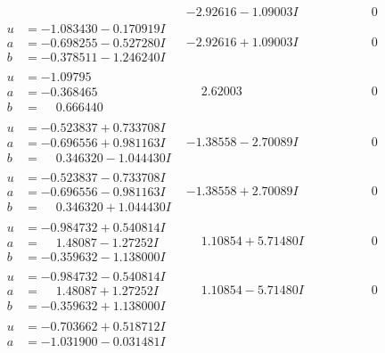 \documentclass[1p]{elsarticle_modified}
\theoremstyle{definition}
\begin{document}
$$\begin{array}{c|c|c}
 & -2.92616 - 1.09003 I & \phantom{-0.000000 } 0 \\ \hline\begin{aligned}
u &= -1.083430 - 0.170919 I \\
a &= -0.698255 - 0.527280 I \\
b &= -0.378511 - 1.246240 I\end{aligned}
 & -2.92616 + 1.09003 I & \phantom{-0.000000 } 0 \\ \hline\begin{aligned}
u &= -1.09795\phantom{ +0.000000I} \\
a &= -0.368465\phantom{ +0.000000I} \\
b &= \phantom{-}0.666440\phantom{ +0.000000I}\end{aligned}
 & \phantom{-}2.62003\phantom{ +0.000000I} & \phantom{-0.000000 } 0 \\ \hline\begin{aligned}
u &= -0.523837 + 0.733708 I \\
a &= -0.696556 + 0.981163 I \\
b &= \phantom{-}0.346320 - 1.044430 I\end{aligned}
 & -1.38558 - 2.70089 I & \phantom{-0.000000 } 0 \\ \hline\begin{aligned}
u &= -0.523837 - 0.733708 I \\
a &= -0.696556 - 0.981163 I \\
b &= \phantom{-}0.346320 + 1.044430 I\end{aligned}
 & -1.38558 + 2.70089 I & \phantom{-0.000000 } 0 \\ \hline\begin{aligned}
u &= -0.984732 + 0.540814 I \\
a &= \phantom{-}1.48087 - 1.27252 I \\
b &= -0.359632 - 1.138000 I\end{aligned}
 & \phantom{-}1.10854 + 5.71480 I & \phantom{-0.000000 } 0 \\ \hline\begin{aligned}
u &= -0.984732 - 0.540814 I \\
a &= \phantom{-}1.48087 + 1.27252 I \\
b &= -0.359632 + 1.138000 I\end{aligned}
 & \phantom{-}1.10854 - 5.71480 I & \phantom{-0.000000 } 0 \\ \hline\begin{aligned}
u &= -0.703662 + 0.518712 I \\
a &= -1.031900 - 0.031481 I \\

\end{aligned}
\end{array}$$
\end{document}
